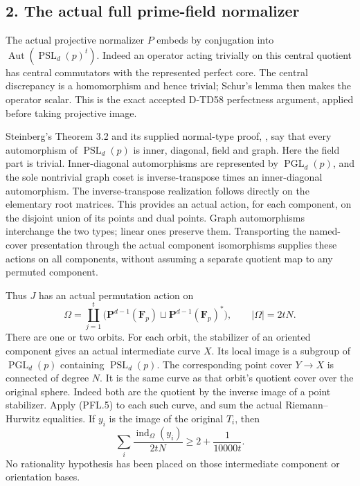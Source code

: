 \subsection*{2. The actual full prime-field normalizer}

The actual projective normalizer \(P\) embeds by conjugation into
\(\operatorname{Aut}(\operatorname{PSL}_d(p)^t)\).
Indeed an operator acting trivially on this central quotient has
central commutators with the represented perfect core. The
central discrepancy is a homomorphism and hence trivial; Schur's
lemma then makes the operator scalar. This is the exact accepted
D-TD58 perfectness argument, applied before taking projective image.

Steinberg's Theorem 3.2 and its supplied normal-type proof,
\cite[pp.607--613, Sections 3--6]{PFL:Steinberg1960}, say that
every automorphism of \(\operatorname{PSL}_d(p)\) is inner,
diagonal, field and graph. Here the field part is trivial.
Inner-diagonal automorphisms are represented by
\(\operatorname{PGL}_d(p)\), and the sole nontrivial graph coset
is inverse-transpose times an inner-diagonal automorphism.
The inverse-transpose realization follows directly on the
elementary root matrices. This provides an actual action, for
each component, on the disjoint union of its points and dual
points. Graph automorphisms interchange the two types; linear
ones preserve them. Transporting the named-cover presentation
through the actual component isomorphisms supplies these actions
on all components, without assuming a separate quotient map
to any permuted component.

Thus \(J\) has an actual permutation action on
\[
                  \Omega=\coprod_{j=1}^t
                   \bigl(\mathbf P^{d-1}(\mathbf F_p)
                          \sqcup\mathbf P^{d-1}(\mathbf F_p)^*\bigr),
                  \qquad |\Omega|=2tN.
 \tag{PFL.6}
\]
There are one or two orbits. For each orbit, the stabilizer of
an oriented component gives an actual intermediate curve \(X\).
Its local image is a subgroup of \(\operatorname{PGL}_d(p)\)
containing \(\operatorname{PSL}_d(p)\). The corresponding point
cover \(Y\to X\) is connected of degree \(N\). It is the same
curve as that orbit's quotient cover over the original sphere.
Indeed both are the quotient by the inverse image of a point
stabilizer. Apply (PFL.5) to each such curve, and sum the actual
Riemann--Hurwitz equalities. If \(y_i\) is the image of the
original \(T_i\), then
\[
               \sum_i\frac{\operatorname{ind}_\Omega(y_i)}{2tN}
                          \ge2+\frac1{10000t}.
 \tag{PFL.7}
\]
No rationality hypothesis has been placed on those intermediate
component or orientation bases.

